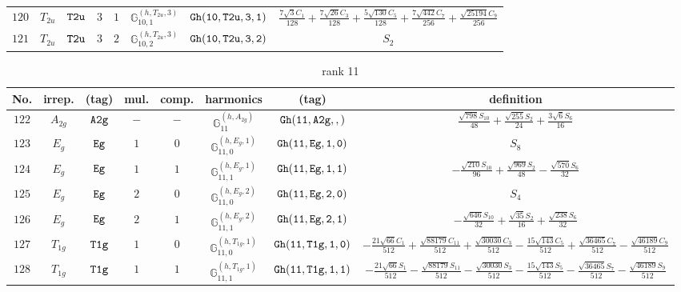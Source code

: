 \documentclass[fleqn,8pt]{jsarticle}
\begin{document}
\begin{table}[ht!]
\begin{center}
\begin{tabular}{cccccccc}
$ 120 $ & $ T_{2u} $ & $ {\tt T2u} $ & $ 3 $ & $ 1 $ & $ \mathbb{G}_{10,1}^{(h,T_{2u},3)} $ & $ {\tt Gh(10,T2u,3,1)} $ & $ \frac{7 \sqrt{3} C_{1}}{128} + \frac{7 \sqrt{26} C_{3}}{128} + \frac{5 \sqrt{130} C_{5}}{128} + \frac{7 \sqrt{442} C_{7}}{256} + \frac{\sqrt{25194} C_{9}}{256} $ \\
$ 121 $ & $ T_{2u} $ & $ {\tt T2u} $ & $ 3 $ & $ 2 $ & $ \mathbb{G}_{10,2}^{(h,T_{2u},3)} $ & $ {\tt Gh(10,T2u,3,2)} $ & $ S_{2} $ \\
 \hline \hline
\end{tabular}
\end{center}
\end{table}
\begin{table}[ht!]
\begin{center}
\caption{rank 11}
\renewcommand{\arraystretch}{1.3}
\begin{tabular}{cccccccc} \hline \hline
No. & irrep. & (tag) & mul. & comp. & harmonics & (tag) & definition \\ \hline
$ 122 $ & $ A_{2g} $ & $ {\tt A2g} $ & $ - $ & $ - $ & $ \mathbb{G}_{11}^{(h,A_{2g})} $ & $ {\tt Gh(11,A2g,,)} $ & $ \frac{\sqrt{798} S_{10}}{48} + \frac{\sqrt{255} S_{2}}{24} + \frac{3 \sqrt{6} S_{6}}{16} $ \\
$ 123 $ & $ E_{g} $ & $ {\tt Eg} $ & $ 1 $ & $ 0 $ & $ \mathbb{G}_{11,0}^{(h,E_{g},1)} $ & $ {\tt Gh(11,Eg,1,0)} $ & $ S_{8} $ \\
$ 124 $ & $ E_{g} $ & $ {\tt Eg} $ & $ 1 $ & $ 1 $ & $ \mathbb{G}_{11,1}^{(h,E_{g},1)} $ & $ {\tt Gh(11,Eg,1,1)} $ & $ - \frac{\sqrt{210} S_{10}}{96} + \frac{\sqrt{969} S_{2}}{48} - \frac{\sqrt{570} S_{6}}{32} $ \\
$ 125 $ & $ E_{g} $ & $ {\tt Eg} $ & $ 2 $ & $ 0 $ & $ \mathbb{G}_{11,0}^{(h,E_{g},2)} $ & $ {\tt Gh(11,Eg,2,0)} $ & $ S_{4} $ \\
$ 126 $ & $ E_{g} $ & $ {\tt Eg} $ & $ 2 $ & $ 1 $ & $ \mathbb{G}_{11,1}^{(h,E_{g},2)} $ & $ {\tt Gh(11,Eg,2,1)} $ & $ - \frac{\sqrt{646} S_{10}}{32} + \frac{\sqrt{35} S_{2}}{16} + \frac{\sqrt{238} S_{6}}{32} $ \\
$ 127 $ & $ T_{1g} $ & $ {\tt T1g} $ & $ 1 $ & $ 0 $ & $ \mathbb{G}_{11,0}^{(h,T_{1g},1)} $ & $ {\tt Gh(11,T1g,1,0)} $ & $ - \frac{21 \sqrt{66} C_{1}}{512} + \frac{\sqrt{88179} C_{11}}{512} + \frac{\sqrt{30030} C_{3}}{512} - \frac{15 \sqrt{143} C_{5}}{512} + \frac{\sqrt{36465} C_{7}}{512} - \frac{\sqrt{46189} C_{9}}{512} $ \\
$ 128 $ & $ T_{1g} $ & $ {\tt T1g} $ & $ 1 $ & $ 1 $ & $ \mathbb{G}_{11,1}^{(h,T_{1g},1)} $ & $ {\tt Gh(11,T1g,1,1)} $ & $ - \frac{21 \sqrt{66} S_{1}}{512} - \frac{\sqrt{88179} S_{11}}{512} - \frac{\sqrt{30030} S_{3}}{512} - \frac{15 \sqrt{143} S_{5}}{512} - \frac{\sqrt{36465} S_{7}}{512} - \frac{\sqrt{46189} S_{9}}{512} $ \\

\end{tabular}
\end{center}
\end{table}
\end{document}
